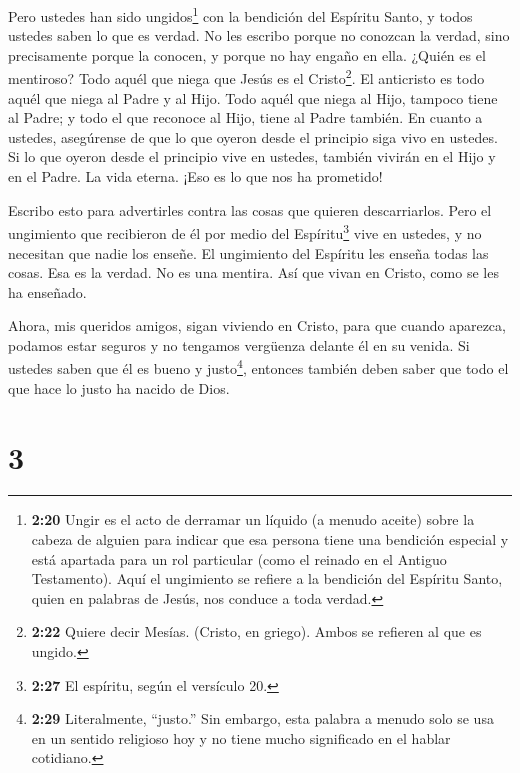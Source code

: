  Pero ustedes han sido ungidos\footnote{\textbf{2:20} Ungir
  es el acto de derramar un líquido (a menudo aceite) sobre la cabeza de
  alguien para indicar que esa persona tiene una bendición especial y
  está apartada para un rol particular (como el reinado en el Antiguo
  Testamento). Aquí el ungimiento se refiere a la bendición del Espíritu
  Santo, quien en palabras de Jesús, nos conduce a toda verdad.} con la
bendición del Espíritu Santo, y todos ustedes saben lo que es verdad.
 No les escribo porque no conozcan la verdad, sino
precisamente porque la conocen, y porque no hay engaño en ella.
 ¿Quién es el mentiroso? Todo aquél que niega que Jesús es
el Cristo\footnote{\textbf{2:22} Quiere decir Mesías. (Cristo, en
  griego). Ambos se refieren al que es ungido.}. El anticristo es todo
aquél que niega al Padre y al Hijo.  Todo aquél que niega
al Hijo, tampoco tiene al Padre; y todo el que reconoce al Hijo, tiene
al Padre también.  En cuanto a ustedes, asegúrense de que
lo que oyeron desde el principio siga vivo en ustedes. Si lo que oyeron
desde el principio vive en ustedes, también vivirán en el Hijo y en el
Padre.  La vida eterna. ¡Eso es lo que nos ha prometido!

 Escribo esto para advertirles contra las cosas que quieren
descarriarlos.  Pero el ungimiento que recibieron de él por
medio del Espíritu\footnote{\textbf{2:27} El espíritu, según el
  versículo 20.} vive en ustedes, y no necesitan que nadie los enseñe.
El ungimiento del Espíritu les enseña todas las cosas. Esa es la verdad.
No es una mentira. Así que vivan en Cristo, como se les ha enseñado.

 Ahora, mis queridos amigos, sigan viviendo en Cristo, para
que cuando aparezca, podamos estar seguros y no tengamos vergüenza
delante él en su venida.  Si ustedes saben que él es bueno
y justo\footnote{\textbf{2:29} Literalmente, ``justo.'' Sin embargo,
  esta palabra a menudo solo se usa en un sentido religioso hoy y no
  tiene mucho significado en el hablar cotidiano.}, entonces también
deben saber que todo el que hace lo justo ha nacido de Dios.

\hypertarget{section-2}{%
\section{3}\label{section-2}}

